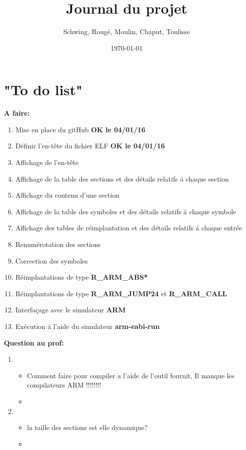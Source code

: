 \documentclass[12pt, a4paper]{article}
\title{Journal du projet}
\author{Schwing, Roug\'e, Moulin, Chaput, Toulisse}
\date{\today}
\begin{document}
\maketitle

\section{"To do list"}
\textbf{A faire:}
\begin{enumerate}
\item Mise en place du gitHub \textbf{OK le 04/01/16} 
\item Définir l'en-t\^ete du fichier ELF \textbf{OK le 04/01/16}
\item Affichage de l'en-t\^ete
\item Affichage de la table des sections et des détails 
	relatifs \'a chaque section
\item Affichage du contenu d'une section
\item Affichage de la table des symboles et des détails relatifs 
	\'a chaque symbole
\item Affichage des tables de réimplantation et des détails relatifs 
	\'a chaque entrée 
\item Renumérotation des sections
\item Correction des symboles
\item Réimplantations de type \textbf{R\_ARM\_ABS*}
\item Réimplantations de type \textbf{R\_ARM\_JUMP24} et 
	\textbf{R\_ARM\_CALL}
\item Interfaçage avec le simulateur \textbf{ARM}
\item Exécution \'a l'aide du simulateur \textbf{arm-eabi-run}
\end{enumerate}

\textbf{Question au prof:}
\begin{enumerate}
\item 
	\begin{itemize}
		\item Comment faire pour compiler a l'aide de l'outil fournit, 
		Il manque les compilateurs ARM !!!!!!!!
		\item 
	\end{itemize}
\item 
	\begin{itemize}
		\item la taille des sections est elle dynamique?
		\item 
	\end{itemize}
\end{enumerate}
\end{document}
